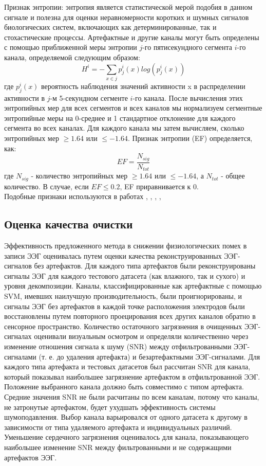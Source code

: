 \documentclass[12pt, a4paper, titlepage]{extreport}
\begin{document}
	Признак энтропии: энтропия является статистической мерой подобия в данном сигнале и полезна для оценки неравномерности коротких и шумных сигналов биологических систем, включающих как детерминированные, так и стохастические процессы. Артефактные и другие каналы могут быть определены с помощью приближенной меры энтропии $j$-го пятисекундного сегмента $i$-го канала, определяемой следующим образом:
	$$
	H^i = - \sum_{x\in j}p^i_j(x)log(p^i_j(x))
	$$
	где $p^i_j(x)$ вероятность наблюдения значений активности x в распределении активности в $j$-м 5-секундном сегменте  $i$-го канала. После вычисления этих энтропийных мер для всех сегментов и всех каналов мы нормализуем сегментные энтропийные меры на 0-среднее и 1 стандартное отклонение для каждого сегмента во всех каналах. Для каждого канала мы затем вычисляем, сколько энтропийных мер $\ge 1.64$ или $\le -1.64$. Признак энтропии (EF) определяется, как:
	$$
	EF=\frac{N_{sig}}{N_{tot}}
	$$
	где $N_{sig}$ - количество энтропийных мер $\ge 1.64$ или $\le -1.64$, а $N_{tot}$ - общее количество. В случае, если $EF \le 0.2$, EF приравнивается к 0.
	\\
	Подобные признаки используются в работах \cite{36}, \cite{33}, \cite{25}, \cite{16}, \cite{15}
	\subsection*{Оценка качества очистки}
	Эффективность предложенного метода в снижении физиологических помех в записи ЭЭГ оценивалась путем оценки качества реконструированных ЭЭГ-сигналов без артефактов. Для каждого типа артефактов были реконструированы сигналы ЭЭГ для каждого тестового датасета (как влажного, так и сухого) и уровня декомпозиции. Каналы, классифицированные как артефактные с помощью SVM, имевших наилучшую производительность, были проигнорированы, и сигналы ЭЭГ без артефактов в каждой точке расположения электродов были восстановлены путем повторного проецирования всех других каналов обратно в сенсорное пространство. Количество остаточного загрязнения в очищенных ЭЭГ-сигналах оценивали визуальным осмотром и определяли количественно через изменение отношения сигнала к шуму (SNR) между отфильтрованными ЭЭГ-сигналами (т. е. до удаления артефакта) и безартефактными ЭЭГ-сигналами. Для каждого типа артефакта и тестовых датасетов был рассчитан SNR для канала, который показывал наибольшее загрязнение артефактом в отфильтрованной ЭЭГ. Положение выбранного канала должно быть совместимо с типом артефакта. Средние значения SNR не были расчитаны  по всем каналам, потому что каналы, не затронутые артефактом, будет ухудшать эффективность системы шумоподавления. Выбор канала варьировался от одного датасета к другому в зависимости от типа удаляемого артефакта и индивидуальных различий. Уменьшение сердечного загрязнения оценивалось для канала, показывающего наибольшее изменение SNR между фильтрованными и не содержащими артефактов ЭЭГ.
	
\end{document}

